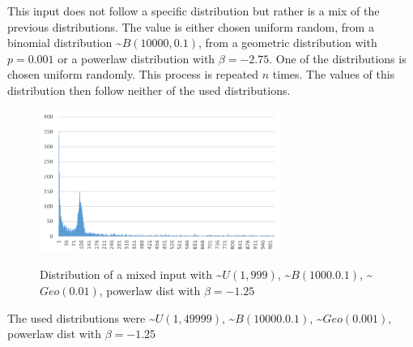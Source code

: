 This input does not follow a specific distribution but rather is a mix of the previous distributions.
The value is either chosen uniform random, from a binomial distribution \textasciitilde$B(10000, 0.1)$, from a geometric distribution with $p=0.001$ or a powerlaw distribution with $\beta=-2.75$.
One of the distributions is chosen uniform randomly.
This process is repeated $n$ times.
The values of this distribution then follow neither of the used distributions.

\begin{figure}[h]
      \caption{Distribution of a mixed input with \textasciitilde$U(1,999)$, \textasciitilde$B(1000.0.1)$, \textasciitilde$Geo(0.01)$, powerlaw dist with $\beta=-1.25$}
      \centering
      \includegraphics[width=0.7\textwidth]{figures/images/numberGenerator/mixed.png}\label{fig:mixedDistExample}
\end{figure}

The used distributions were \textasciitilde$U(1,49999)$, \textasciitilde$B(10000.0.1)$, \textasciitilde$Geo(0.001)$, powerlaw dist with $\beta=-1.25$
